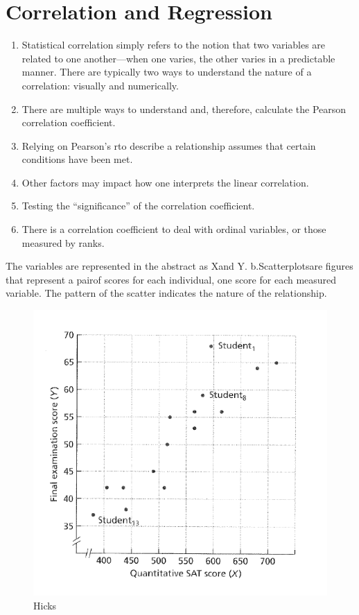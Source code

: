 \documentclass[]{book}
\providecommand{\tightlist}{%
  \setlength{\itemsep}{0pt}\setlength{\parskip}{0pt}}
\theoremstyle{definition}
\theoremstyle{definition}
\theoremstyle{definition}
\theoremstyle{remark}
\begin{document}
{\chapter{Correlation and Regression}\label{correlation-and-regression}

\begin{enumerate}
\def\labelenumi{\arabic{enumi}.}
\tightlist
\item
  Statistical correlation simply refers to the notion that two variables
  are related to one another---when one varies, the other varies in a
  predictable manner. There are typically two ways to understand the
  nature of a correlation: visually and numerically.
\item
  There are multiple ways to understand and, therefore, calculate the
  Pearson correlation coefficient.
\item
  Relying on Pearson's rto describe a relationship assumes that certain
  conditions have been met.
\item
  Other factors may impact how one interprets the linear correlation.
\item
  Testing the ``significance'' of the correlation coefficient.
\item
  There is a correlation coefficient to deal with ordinal variables, or
  those measured by ranks.
\end{enumerate}

The variables are represented in the abstract as Xand Y.
b.Scatterplotsare figures that represent a pairof scores for each
individual, one score for each measured variable. The pattern of the
scatter indicates the nature of the relationship.

\begin{figure}
\centering
\includegraphics{img/hickscor1.png}
\caption{Hicks}
\end{figure}

}
\end{document}
